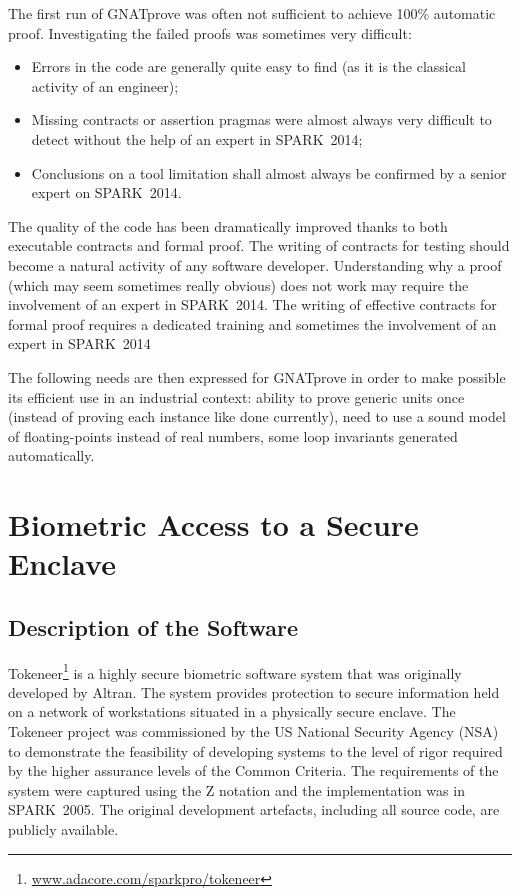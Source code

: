 \documentclass[10pt,a4paper,twocolumn]{article}
\newcommand{\gnatprove}{GNATprove\xspace}
\newcommand{\oldspark}{SPARK~2005\xspace}
\newcommand{\newspark}{SPARK~2014\xspace}
\begin{document}
The first run of \gnatprove was often not sufficient to achieve 100\% automatic
proof. Investigating the failed proofs was sometimes very difficult:
\begin{itemize}
\item Errors in the code are generally quite easy to find (as it is
  the classical activity of an engineer);
\item Missing contracts or assertion pragmas were almost always very difficult to detect without
  the help of an expert in \newspark;
\item Conclusions on a tool limitation shall almost always be confirmed by
  a senior expert on \newspark.
\end{itemize}

The quality of the code has been dramatically improved thanks to both
executable contracts and formal proof.  The writing of contracts for testing
should become a natural activity of any software developer. Understanding why a
proof (which may seem sometimes really obvious) does not work may require the
involvement of an expert in \newspark. The writing of effective contracts for
formal proof requires a dedicated training and sometimes the involvement of an
expert in \newspark

The following needs are then expressed for \gnatprove in order to make possible
its efficient use in an industrial context: ability to prove generic units once
(instead of proving each instance like done currently), need to use a sound
model of floating-points instead of real numbers, some loop invariants
generated automatically.

\section{Biometric Access to a Secure Enclave}
\label{sec:tokeneer}

\subsection{Description of the Software}

Tokeneer\footnote{\url{www.adacore.com/sparkpro/tokeneer}} is a highly secure
biometric software system that was originally developed by Altran. The system
provides protection to secure information held on a network of workstations
situated in a physically secure enclave. The Tokeneer project was commissioned
by the US National Security Agency (NSA) to demonstrate the feasibility of
developing systems to the level of rigor required by the higher assurance
levels of the Common Criteria. The requirements of the system were captured
using the Z notation and the implementation was in \oldspark. The original
development artefacts, including all source code, are publicly available.
\end{document}
